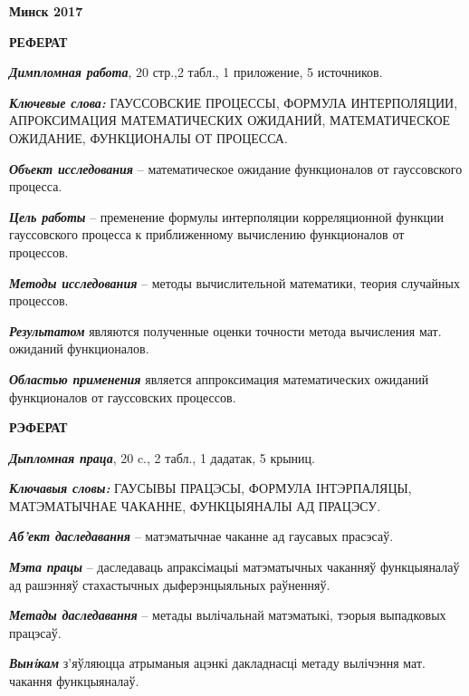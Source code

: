 \documentclass [12pt]{report}
\begin{document}
\bigskip
\bigskip
\bigskip
\bigskip
\begin{center}
	\bf{Минск 2017}
\end{center}


\newpage

\begin{center}
	\textbf{РЕФЕРАТ}
\end{center}

\emph{\textbf{Димпломная работа}}, 20 стр.,2 табл., 1 приложение, 5 источников.

\emph{\textbf{Ключевые слова:}} ГАУССОВСКИЕ ПРОЦЕССЫ, ФОРМУЛА ИНТЕРПОЛЯЦИИ, АПРОКСИМАЦИЯ МАТЕМАТИЧЕСКИХ ОЖИДАНИЙ, МАТЕМАТИЧЕСКОЕ ОЖИДАНИЕ, ФУНКЦИОНАЛЫ ОТ ПРОЦЕССА.

\emph{\textbf{Объект исследования}} -- математическое ожидание функционалов от гауссовского процесса.

\emph{\textbf{Цель работы}} -- пременение формулы интерполяции корреляционной функции гауссовского процесса к приближенному вычислению функционалов от процессов.

\emph{\textbf{Методы исследования}} -- методы вычислительной математики, теория случайных процессов.

\emph{\textbf{Результатом}} являются полученные оценки точности метода вычисления мат. ожиданий функционалов.

\emph{\textbf{Областью применения}} является аппроксимация математических ожиданий функционалов от гауссовских процессов.


\newpage

\begin{center}
	\textbf{РЭФЕРАТ}
\end{center}

\emph{\textbf{Дыпломная праца}}, 20 c., 2 табл., 1 дадатак, 5 крыниц.

\emph{\textbf{Ключавыя словы:}}
ГАУСЫВЫ ПРАЦЭСЫ, ФОРМУЛА ІНТЭРПАЛЯЦЫ, МАТЭМАТЫЧНАЕ ЧАКАННЕ, ФУНКЦЫЯНАЛЫ АД ПРАЦЭСУ.

\emph{\textbf{Аб'ект даследавання}} -- матэматычнае чаканне ад гаусавых прасэсаў.

\emph{\textbf{Мэта працы}} -- даследаваць апраксімацыі матэматычных чаканняў функцыяналаў ад рашэнняў стахастычных дыферэнцыяльных раўненняў.

\emph{\textbf{Метады даследавання}} -- метады вылічальнай матэматыкі, тэорыя выпадковых працэсаў.

\emph{\textbf{Вынiкам}} з'яўляюцца атрыманыя ацэнкі дакладнасці метаду вылічэння мат. чакання функцыяналаў.
\end{document}
